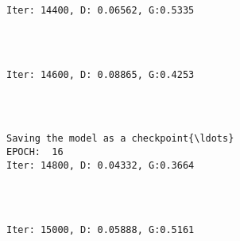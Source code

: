 \documentclass[11pt]{article}
\begin{document}
    \begin{Verbatim}[commandchars=\\\{\}]

Iter: 14400, D: 0.06562, G:0.5335
    \end{Verbatim}

    \begin{center}
    \end{center}
    { \hspace*{\fill} \\}
    
    \begin{Verbatim}[commandchars=\\\{\}]

Iter: 14600, D: 0.08865, G:0.4253
    \end{Verbatim}

    \begin{center}
    \end{center}
    { \hspace*{\fill} \\}
    
    \begin{Verbatim}[commandchars=\\\{\}]

Saving the model as a checkpoint{\ldots}
EPOCH:  16
Iter: 14800, D: 0.04332, G:0.3664
    \end{Verbatim}

    \begin{center}
    \end{center}
    { \hspace*{\fill} \\}
    
    \begin{Verbatim}[commandchars=\\\{\}]

Iter: 15000, D: 0.05888, G:0.5161
    \end{Verbatim}

    \begin{center}
    \end{center}
    { \hspace*{\fill} \\}
    
\end{document}

